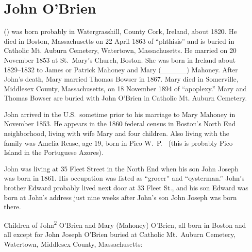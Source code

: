 \section{John O'Brien}

  () was born probably in Watergrasshill, County Cork, Ireland, about 1820.\cite{John2OBrienMarriage} He died in Boston, Massachusetts on 22 April 1863 of ``phthisis'' \cite{John2OBrienDeath} and is buried in Catholic Mt. Auburn Cemetery, Watertown, Massachusetts.\cite{BillMcEvoy} He married  on 20 November 1853 at St.\ Mary's Church, Boston.\cite{John2OBrienMarriage} She was born in Ireland about 1829--1832 to James or Patrick Mahoney and Mary (\_\_\_\_\_)  Mahoney.\cite{John2OBrienCivilMarriage,MaryMahoneyBowserMarriage} After John's death, Mary married Thomas Bowser in 1867.\cite{MaryMahoneyBowserMarriage} Mary died in Somerville, Middlesex County, Massachusetts, on 18 November 1894 of ``apoplexy.''\cite{MaryMahoneyDeath} Mary and Thomas Bowser are buried with John O'Brien in Catholic Mt. Auburn Cemetery.\cite{BillMcEvoy}

John arrived in the U.S.\ sometime prior to his marriage to Mary Mahoney in November 1853. He appears in the 1860 federal census in Boston's North End neighborhood, living with wife Mary and four children. Also living with the family was Amelia Rease, age 19, born in Pico W.\ P.\ \cite{Census1860John} (this is probably Pico Island in the Portuguese Azores). 

John was living at 35 Fleet Street in the North End when his son John Joseph was born in 1861. His occupation was listed as ``grocer''\cite{John3OBrienBirth,Wards} and ``oysterman.''\cite{1861John2OBrien} John's brother Edward probably lived next door at 33 Fleet St.,\cite{1861EdwardOBrien} and his son Edward was born at John's address just nine weeks after John's son John Joseph was born there.\cite{John3OBrienBirth}

\begin{KidsIntro}
	Children of John\textsuperscript{2} O'Brien and Mary (Mahoney) O'Brien, all born in Boston and all except for John Joseph O'Brien buried at Catholic Mt.\ Auburn Cemetery, Watertown, Middlesex County, Massachusetts:\cite{BillMcEvoy}
\end{KidsIntro}

